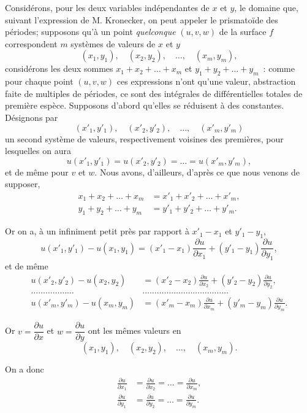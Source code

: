 \documentclass{article}
\begin{document}
Considérons, pour les deux variables indépendantes de $x$ et $y$, le domaine que, suivant l'expression de M. Kronecker, on peut appeler le prismatoïde des périodes; supposons qu'à un point \emph{quelconque} $(u, v, w)$ de la surface $f$ correspondent $m$ systèmes de valeurs de $x$ et $y$
\[
(x_{1}, y_{1}), \quad (x_{2}, y_{2}), \quad \ldots, \quad (x_{m}, y_{m}),
\]
considérons les deux sommes $x_{1} + x_{2} + \ldots + x_{m}$ et $y_{1} + y_{2} + \ldots + y_{m}$~: comme pour chaque point $(u, v, w)$ ces expressions n'ont qu'une valeur, abstraction faite de multiples de périodes, ce sont des intégrales de différentielles totales de première espèce. Supposons d'abord qu'elles se réduisent à des constantes. Désignons par
\[
(x'_{1}, y'_{1}), \quad (x'_{2}, y'_{2}), \quad \ldots, \quad (x'_{m}, y'_{m})
\]
un second système de valeurs, respectivement voisines des premières, pour lesquelles on aura
\[
u(x'_{1}, y'_{1}) = u(x'_{2}, y'_{2}) = \ldots = u(x'_{m}, y'_{m}),
\]
et de même pour $v$ et $w$. Nous avons, d'ailleurs, d'après ce que nous venons de supposer,
\[
\begin{aligned}
x_{1} + x_{2} + \ldots + x_{m} &= x'_{1} + x'_{2} + \ldots + x'_{m}, \\
y_{1} + y_{2} + \ldots + y_{m} &= y'_{1} + y'_{2} + \ldots + y'_{m}.
\end{aligned}
\tag{2}
\]

Or on a, à un infiniment petit près par rapport à $x'_{1} - x_{1}$ et $y'_{1} - y_{1}$,
\[
u(x'_{1}, y'_{1}) - u(x_{1}, y_{1}) = (x'_{1} - x_{1})\frac{\partial u}{\partial x_{1}} + (y'_{1} - y_{1})\frac{\partial u}{\partial y_{1}},
\]
et de même
\[
\begin{aligned}
u(x'_{2}, y'_{2}) - u(x_{2}, y_{2}) &= (x'_{2} - x_{2})\frac{\partial u}{\partial x_{2}} + (y'_{2} - y_{2})\frac{\partial u}{\partial y_{2}}, \\
\ldots\ldots\ldots\ldots\ldots\ldots &\ldots\ldots\ldots\ldots\ldots\ldots\ldots\ldots\ldots\ldots\ldots\ldots \\
u(x'_{m}, y'_{m}) - u(x_{m}, y_{m}) &= (x'_{m} - x_{m})\frac{\partial u}{\partial x_{m}} + (y'_{m} - y_{m})\frac{\partial u}{\partial y_{m}}.
\end{aligned}
\]

Or $v = \dfrac{\partial u}{\partial x}$ et $w = \dfrac{\partial u}{\partial y}$ ont les mêmes valeurs en
\[
(x_{1}, y_{1}), \quad (x_{2}, y_{2}), \quad \ldots, \quad (x_{m}, y_{m}).
\]

On a donc
\[
\begin{aligned}
\frac{\partial u}{\partial x_{1}} &= \frac{\partial u}{\partial x_{2}} = \ldots = \frac{\partial u}{\partial x_{m}}, \\
\frac{\partial u}{\partial y_{1}} &= \frac{\partial u}{\partial y_{2}} = \ldots = \frac{\partial u}{\partial y_{m}}.
\end{aligned}
\tag{3}
\]
\end{document}
